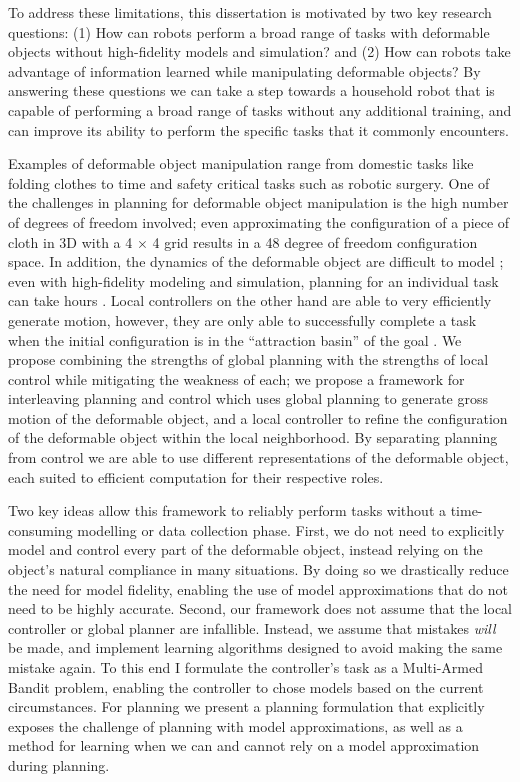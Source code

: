 To address these limitations, this dissertation is motivated by two key research questions: (1) How can robots perform a broad range of tasks with deformable objects without high-fidelity models and simulation? and (2) How can robots take advantage of information learned while manipulating deformable objects? By answering these questions we can take a step towards a household robot that is capable of performing a broad range of tasks without any additional training, and can improve its ability to perform the specific tasks that it commonly encounters.

Examples of deformable object manipulation range from domestic tasks like folding clothes to time and safety critical tasks such as robotic surgery. One of the challenges in planning for deformable object manipulation is the high number of degrees of freedom involved; even approximating the configuration of a piece of cloth in 3D with a 4 $\times$ 4 grid results in a 48 degree of freedom configuration space. In addition, the dynamics of the deformable object are difficult to model \cite{Essahbi2012}; even with high-fidelity modeling and simulation, planning for an individual task can take hours \cite{Bai2016}. Local controllers on the other hand are able to very efficiently generate motion, however, they are only able to successfully complete a task when the initial configuration is in the ``attraction basin'' of the goal \cite{Berenson2013, McConachie2018}. We propose combining the strengths of global planning with the strengths of local control while mitigating the weakness of each; we propose a framework for interleaving planning and control which uses global planning to generate gross motion of the deformable object, and a local controller to refine the configuration of the deformable object within the local neighborhood. By separating planning from control we are able to use different representations of the deformable object, each suited to efficient computation for their respective roles.

Two key ideas allow this framework to reliably perform tasks without a time-consuming modelling or data collection phase. First, we do not need to explicitly model and control every part of the deformable object, instead relying on the object's natural compliance in many situations. By doing so we drastically reduce the need for model fidelity, enabling the use of model approximations that do not need to be highly accurate. Second, our framework does not assume that the local controller or global planner are infallible. Instead, we assume that mistakes \textit{will} be made, and implement learning algorithms designed to avoid making the same mistake again. To this end I formulate the controller's task as a Multi-Armed Bandit problem, enabling the controller to chose models based on the current circumstances. For planning we present a planning formulation that explicitly exposes the challenge of planning with model approximations, as well as a method for learning when we can and cannot rely on a model approximation during planning.

